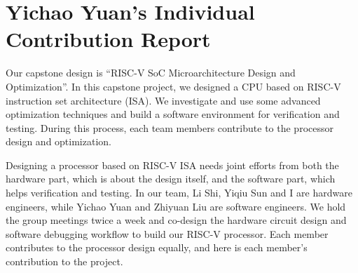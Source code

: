 \chapter*{Yichao Yuan's Individual Contribution Report}

Our capstone design is ``RISC-V SoC Microarchitecture Design and Optimization''. In this capstone project, we designed a CPU based on RISC-V instruction set architecture (ISA). We investigate and use some advanced optimization techniques and build a software environment for verification and testing. During this process, each team members contribute to the processor design and optimization.

Designing a processor based on RISC-V ISA needs joint efforts from both the hardware part, which is about the design itself, and the software part, which helps verification and testing. In our team, Li Shi, Yiqiu Sun and I are hardware engineers, while Yichao Yuan and Zhiyuan Liu are software engineers. We hold the group meetings twice a week and co-design the hardware circuit design and software debugging workflow to build our RISC-V processor. Each member contributes to the processor design equally, and here is each member’s contribution to the project.

